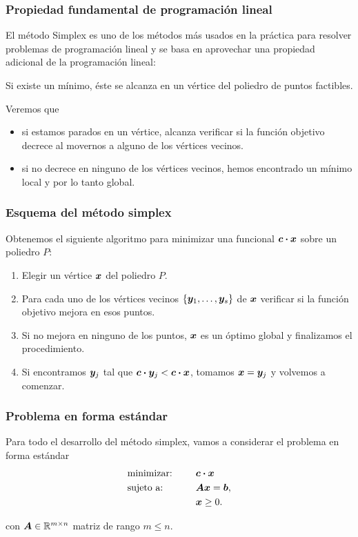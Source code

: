 \documentclass[aspectratio=169,12pt,spanish]{beamer}
\begin{document}

\begin{frame}
\frametitle{Propiedad fundamental de programación lineal}

El método Simplex es uno de los métodos más usados en la práctica para resolver problemas de programaci\'on lineal y se basa en aprovechar una propiedad adicional de la programación lineal:
\begin{block}{}
Si existe un mínimo, éste se alcanza en un vértice del poliedro de puntos factibles. 
\end{block}{}

Veremos que 
\begin{itemize}
\item si estamos parados en un vértice, alcanza verificar si la función objetivo decrece al movernos a alguno de los vértices vecinos. 
\item si no decrece en ninguno de los vértices vecinos, hemos encontrado un mínimo local y por lo tanto global. 
\end{itemize}

\end{frame}


\begin{frame}
\frametitle{Esquema del método simplex}

Obtenemos el siguiente algoritmo para minimizar una funcional $\bm{c} \boldsymbol{\cdot} \bm{x}$ sobre un poliedro $P$:
\begin{enumerate}
\item Elegir un vértice $\bm{x}$ del poliedro $P$.
\item Para cada uno de los vértices vecinos $\{\bm{y}_1, \dots, \bm{y}_s\}$ de $\bm{x}$ verificar si la función objetivo mejora en esos puntos.
\item Si no mejora en ninguno de los puntos, $\bm{x}$ es un óptimo global y finalizamos el procedimiento.
\item Si encontramos $\bm{y}_j$ tal que $\bm{c} \boldsymbol{\cdot} \bm{y}_j < \bm{c} \boldsymbol{\cdot} \bm{x}$, tomamos $\bm{x} = \bm{y}_j$ y volvemos a comenzar.
\end{enumerate}

\end{frame}


\begin{frame}
\frametitle{Problema en forma estándar}

Para todo el desarrollo del método simplex, vamos a considerar el problema en forma estándar
\begin{alignat*}{2}
  & \text{minimizar: } & & \bm{c} \boldsymbol{\cdot} \bm{x} \\
   & \text{sujeto a: } & \quad & \bm{A}\bm{x} = \bm{b}, \\
   & & & \bm{x} \ge 0.
\end{alignat*}

con $\bm{A} \in \mathbb{R}^{m \times n}$ matriz de rango $m \le n$.
\end{frame}
\end{document}
